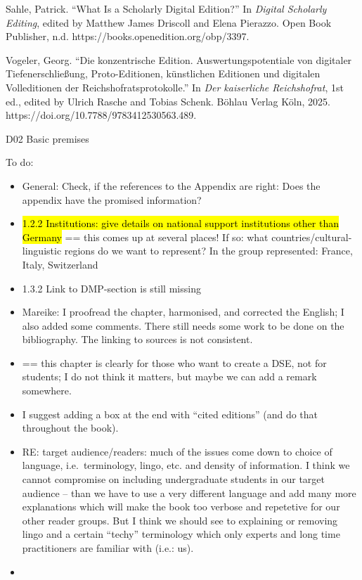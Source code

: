 \documentclass[
  letterpaper,
  DIV=11,
  numbers=noendperiod]{scrreprt}
\providecommand{\tightlist}{%
  \setlength{\itemsep}{0pt}\setlength{\parskip}{0pt}}\usepackage{longtable,booktabs,array}
\begin{document}
Sahle, Patrick. ``What Is a Scholarly Digital Edition?'' In
\emph{Digital Scholarly Editing}, edited by Matthew James Driscoll and
Elena Pierazzo. Open Book Publisher, n.d.
https://books.openedition.org/obp/3397.

Vogeler, Georg. ``Die konzentrische Edition. Auswertungspotentiale von
digitaler Tiefenerschließung, Proto-Editionen, künstlichen Editionen und
digitalen Volleditionen der Reichshofratsprotokolle.'' In \emph{Der
kaiserliche Reichshofrat}, 1st ed., edited by Ulrich Rasche and Tobias
Schenk. Böhlau Verlag Köln, 2025.
https://doi.org/10.7788/9783412530563.489.

D02 Basic premises

To do:

\begin{itemize}
\tightlist
\item
  General: Check, if the references to the Appendix are right: Does the
  appendix have the promised information?
\end{itemize}

\begin{itemize}
\item
  \hl{1.2.2 Institutions: give details on national support institutions
  other than Germany} == this comes up at several places! If so: what
  countries/cultural-linguistic regions do we want to represent? In the
  group represented: France, Italy, Switzerland\hl{}
\item
  1.3.2 Link to DMP-section is still missing
\item
  Mareike: I proofread the chapter, harmonised, and corrected the
  English; I also added some comments. There still needs some work to be
  done on the bibliography. The linking to sources is not consistent.
\item
  == this chapter is clearly for those who want to create a DSE, not for
  students; I do not think it matters, but maybe we can add a remark
  somewhere.
\item
  I suggest adding a box at the end with ``cited editions'' (and do that
  throughout the book).
\item
  RE: target audience/readers: much of the issues come down to choice of
  language, i.e.~terminology, lingo, etc. and density of information. I
  think we cannot compromise on including undergraduate students in our
  target audience -- than we have to use a very different language and
  add many more explanations which will make the book too verbose and
  repetetive for our other reader groups. But I think we should see to
  explaining or removing lingo and a certain ``techy'' terminology which
  only experts and long time practitioners are familiar with (i.e.: us).
\item
\end{itemize}
\end{document}
